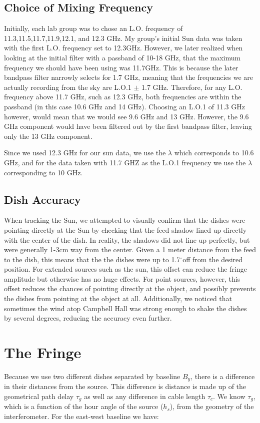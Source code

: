 \documentclass{article}
\newcommand{\degree}{\ensuremath{^\circ}}
\begin{document}
\subsection{Choice of Mixing Frequency}

Initially, each lab group was to chose an L.O. frequency of 11.3,11.5,11.7,11.9,12.1, and 12.3 GHz. My group's initial Sun data was taken with the first L.O. frequency set to 12.3GHz. However, we later realized when looking at the initial filter with a passband of 10-18 GHz, that the maximum frequency we should have been using was 11.7GHz. This is because the later bandpass filter narrowly selects for 1.7 GHz, meaning that the frequencies we are actually recording from the sky are L.O.1 $\pm$ 1.7 GHz. Therefore, for any L.O. frequency above 11.7 GHz, such as 12.3 GHz, both frequencies are within the passband (in this case 10.6 GHz and 14 GHz). Choosing an L.O.1 of 11.3 GHz however, would mean that we would see 9.6 GHz and 13 GHz. However, the 9.6 GHz component would have been filtered out by the first bandpass filter, leaving only the 13 GHz component.

Since we used 12.3 GHz for our sun data, we use the $\lambda$ which corresponds to 10.6 GHz, and for the data taken with 11.7 GHZ as the L.O.1 frequency we use the $\lambda$ corresponding to 10 GHz.

\subsection{Dish Accuracy}

When tracking the Sun, we attempted to visually confirm that the dishes were pointing directly at the Sun by checking that the feed shadow lined up directly with the center of the dish. In reality, the shadows did not line up perfectly, but were generally 1-3cm way from the center. Given a 1 meter distance from the feed to the dish, this means that the the dishes were up to 1.7\degree off from the desired position. For extended sources such as the sun, this offset can reduce the fringe amplitude but otherwise has no huge effects. For point sources, however, this offset reduces the chances of pointing directly at the object, and possibly prevents the dishes from pointing at the object at all. Additionally, we noticed that sometimes the wind atop Campbell Hall was strong enough to shake the dishes by several degrees, reducing the accuracy even further.

\section{The Fringe}
Because we use two different dishes separated by baseline \textit{$B_y$}, there is a difference in their distances from the source. This difference is distance is made up of the geometrical path delay $\tau_{g}$ as well as any difference in cable length $\tau_{c}$. We know $\tau_{g}$, which is a function of the hour angle of the source ($h_s$), from the geometry of the interferometer. For the east-west baseline we have:
\end{document}
